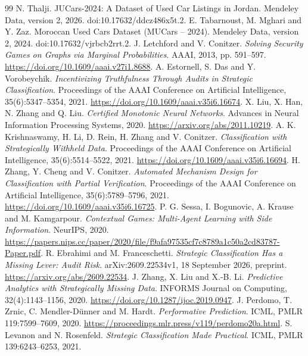 \documentclass[11pt]{article}
\begin{document}
\begingroup\small
\begin{thebibliography}{99}\setlength{\itemsep}{0pt}\setlength{\parskip}{0pt}
 N. Thalji.
JUCars-2024: A Dataset of Used Car Listings in Jordan.
Mendeley Data, version 2, 2026. doi:10.17632/ddcz486x5t.2.
 E. Tabarnoust, M. Mghari and Y. Zaz.
Moroccan Used Cars Dataset (MUCars -- 2024).
Mendeley Data, version 2, 2024. doi:10.17632/vjrbcb2rrt.2.
 J. Letchford and V. Conitzer.
\emph{Solving Security Games on Graphs via Marginal Probabilities}.
AAAI, 2013, pp. 591--597. \url{https://doi.org/10.1609/aaai.v27i1.8688}.
 A. Estornell, S. Das and Y. Vorobeychik.
\emph{Incentivizing Truthfulness Through Audits in Strategic Classification}.
Proceedings of the AAAI Conference on Artificial Intelligence,
35(6):5347--5354, 2021. \url{https://doi.org/10.1609/aaai.v35i6.16674}.
 X. Liu, X. Han, N. Zhang and Q. Liu.
\emph{Certified Monotonic Neural Networks}.
Advances in Neural Information Processing Systems, 2020.
\url{https://arxiv.org/abs/2011.10219}.
 A. K. Krishnaswamy, H. Li, D. Rein, H. Zhang and V. Conitzer.
\emph{Classification with Strategically Withheld Data}.
Proceedings of the AAAI Conference on Artificial Intelligence,
35(6):5514--5522, 2021. \url{https://doi.org/10.1609/aaai.v35i6.16694}.
 H. Zhang, Y. Cheng and V. Conitzer.
\emph{Automated Mechanism Design for Classification with Partial Verification}.
Proceedings of the AAAI Conference on Artificial Intelligence,
35(6):5789--5796, 2021.
\url{https://doi.org/10.1609/aaai.v35i6.16725}.
 P. G. Sessa, I. Bogunovic, A. Krause and M. Kamgarpour.
\emph{Contextual Games: Multi-Agent Learning with Side Information}.
NeurIPS, 2020.
\url{https://papers.nips.cc/paper/2020/file/f9afa97535cf7c8789a1c50a2cd83787-Paper.pdf}.
 R. Ebrahimi and M. Franceschetti.
\emph{Strategic Classification Has a Missing Lever: Audit Risk}.
arXiv:2609.22534v1, 18 September 2026, preprint.
\url{https://arxiv.org/abs/2609.22534}.
 J. Zhang, X. Liu and X.-B. Li.
\emph{Predictive Analytics with Strategically Missing Data}.
INFORMS Journal on Computing, 32(4):1143--1156, 2020.
\url{https://doi.org/10.1287/ijoc.2019.0947}.
 J. Perdomo, T. Zrnic, C. Mendler-D\"unner and M. Hardt.
\emph{Performative Prediction}. ICML, PMLR 119:7599--7609, 2020.
\url{https://proceedings.mlr.press/v119/perdomo20a.html}.
 S. Levanon and N. Rosenfeld.
\emph{Strategic Classification Made Practical}. ICML, PMLR 139:6243--6253, 2021.

\end{thebibliography}
\end{document}
